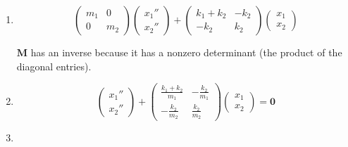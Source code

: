 \documentclass{article}
\begin{document}
\setcounter{subsubsection}{10}
\subsubsection{}

\begin{enumerate}
  \item \[\begin{pmatrix}
            m_1 & 0   \\
            0   & m_2
          \end{pmatrix} \begin{pmatrix}
            x_1'' \\
            x_2''
          \end{pmatrix} + \begin{pmatrix}
            k_1 + k_2 & -k_2 \\
            -k_2      & k_2
          \end{pmatrix} \begin{pmatrix}
            x_1 \\
            x_2
          \end{pmatrix}\]

        $\mathbf{M}$ has an inverse because it has a nonzero determinant (the product of the diagonal entries).

  \item \[\begin{pmatrix}
            x_1'' \\
            x_2''
          \end{pmatrix} + \begin{pmatrix}
            \frac{k_1 + k_2}{m_1} & -\frac{k_2}{m_1} \\
            -\frac{k_2}{m_2}      & \frac{k_2}{m_2}
          \end{pmatrix} \begin{pmatrix}
            x_1 \\
            x_2
          \end{pmatrix} = \mathbf{0}\]

  \item


\end{enumerate}
\end{document}
